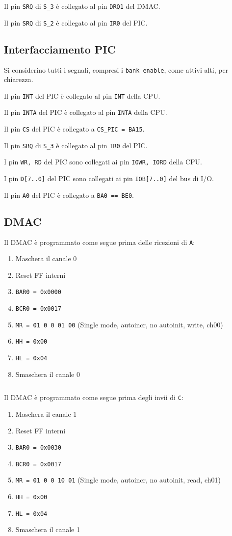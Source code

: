 \documentclass[a4paper]{article}
\begin{document}
Il pin \texttt{SRQ} di \texttt{S\_3} è collegato al pin \texttt{DRQ1} del DMAC.

Il pin \texttt{SRQ} di \texttt{S\_2} è collegato al pin \texttt{IR0} del PIC.

\subsection{Interfacciamento PIC}
Si considerino tutti i segnali, compresi i \texttt{bank enable}, come attivi alti, per chiarezza.

Il pin \texttt{INT} del PIC è collegato al pin \texttt{INT} della CPU.

Il pin \texttt{INTA} del PIC è collegato al pin \texttt{INTA} della CPU.

Il pin \texttt{CS} del PIC è collegato a \texttt{CS\_PIC = BA15}.

Il pin \texttt{SRQ} di \texttt{S\_3} è collegato al pin \texttt{IR0} del PIC.

I pin \texttt{WR, RD} del PIC sono collegati ai pin \texttt{IOWR, IORD} della CPU.

I pin \texttt{D[7..0]} del PIC sono collegati ai pin \texttt{IOB[7..0]} del bus di I/O.

Il pin \texttt{A0} del PIC è collegato a \texttt{BA0 == BE0}.
\subsection{DMAC}

Il DMAC è programmato come segue prima delle ricezioni di \texttt{A}:
\begin{enumerate}
\item Maschera il canale 0
\item Reset FF interni
\item \texttt{BAR0 = 0x0000}
\item \texttt{BCR0 = 0x0017}
\item \texttt{MR = 01 0 0 01 00} (Single mode, autoincr, no autoinit, write, ch00)
\item \texttt{HH = 0x00}
\item \texttt{HL = 0x04}
\item Smaschera il canale 0
\end{enumerate}

\begin{verbatim}
\end{verbatim}

Il DMAC è programmato come segue prima degli invii di \texttt{C}:
\begin{enumerate}
\item Maschera il canale 1
\item Reset FF interni
\item \texttt{BAR0 = 0x0030}
\item \texttt{BCR0 = 0x0017}
\item \texttt{MR = 01 0 0 10 01} (Single mode, autoincr, no autoinit, read, ch01)
\item \texttt{HH = 0x00}
\item \texttt{HL = 0x04}
\item Smaschera il canale 1
\end{enumerate}
\end{document}
